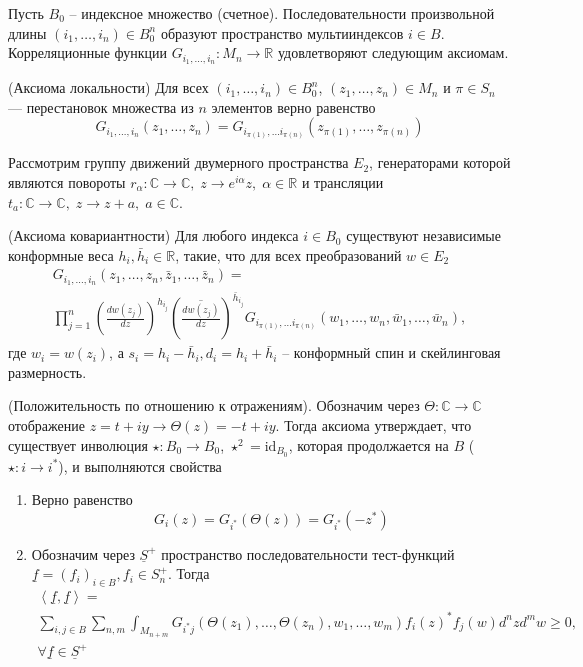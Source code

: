   Пусть $B_{0}$ -- индексное множество (счетное). Последовательности произвольной длины $(i_{1},\dots,i_{n})\in B_{0}^{n}$ образуют пространство мультииндексов $i\in B$.  Корреляционные функции $G_{i_{1},\dots, i_{n}}:M_{n}\to \mathbb{R}$ удовлетворяют следующим аксиомам.
\begin{axiom}
  (Аксиома локальности)
  Для всех $(i_{1},\dots,i_{n})\in B_{0}^{n}$, $(z_{1},\dots, z_{n})\in M_{n}$ и $\pi\in S_{n}$ --- перестановок множества из $n$ элементов верно равенство
  \begin{equation}
    \label{eq:51}
    G_{i_{1},\dots,i_{n}}(z_{1},\dots,z_{n})=G_{i_{\pi(1)},\dots i_{\pi(n)}}(z_{\pi(1)},\dots, z_{\pi(n)})
  \end{equation}
\end{axiom}
Рассмотрим группу движений двумерного пространства $E_{2}$, генераторами которой являются повороты $r_{\alpha}:\mathbb{C}\to\mathbb{C}, \; z\to e^{i\alpha}z,\; \alpha\in \mathbb{R}$ и трансляции $t_{a}:\mathbb{C}\to\mathbb{C},\; z\to z+a,\; a\in\mathbb{C}$. 
\begin{axiom}
  (Аксиома ковариантности)
  Для любого индекса $i\in B_{0}$  существуют независимые конформные веса $h_{i},\bar h_{i}\in \mathbb{R}$, такие, что для всех преобразований $w\in E_{2}$
  \begin{multline}
    \label{eq:52}
    G_{i_{1},\dots,i_{n}}(z_{1},\dots,z_{n},\bar z_{1},\dots, \bar z_{n})=\\
\prod_{j=1}^{n}\left(\frac{dw(z_{j})}{dz}\right)^{h_{i_{j}}}\left(\overline{\frac{dw(z_{j})}{dz}}\right)^{\bar{h}_{i_{j}}} G_{i_{\pi(1)},\dots i_{\pi(n)}}(w_{1},\dots, w_{n},\bar w_{1},\dots,\bar w_{n}),
  \end{multline}
где $w_{i}=w(z_{i})$, а $s_{i}=h_{i}-\bar h_{i}, d_{i}=h_{i}+\bar h_{i}$  -- конформный спин и скейлинговая размерность.
\end{axiom}
\begin{axiom}
  (Положительность по отношению к отражениям).
  Обозначим через $\Theta:\mathbb{C}\to\mathbb{C}$  отображение $z=t+i y\to \Theta(z)= -t+i y$. Тогда аксиома утверждает, что существует инволюция $\star:B_{0}\to B_{0}$, $\star^{2}=\mathrm{id}_{B_{0}}$, которая продолжается на $B$ ($\star:i\to i^{*}$), и выполняются свойства
  \begin{enumerate}
  \item Верно равенство
    \begin{equation}
      \label{eq:53}
      G_{i}(z)=G_{i^{*}}(\Theta(z))=G_{i^{*}}(-z^{*})
    \end{equation}
  \item Обозначим через $\underline{S}^{+}$ пространство последовательности тест-функций $\underline{f}=(f_{i})_{i\in B}, f_{i}\in S^{+}_{n}$. Тогда
    \begin{multline}
      \label{eq:54}
      \left<\underline{f},\underline{f}\right>=\\
      \sum_{i,j\in B}\sum_{n,m}\int_{M_{n+m}}G_{i^{*} j}(\Theta(z_{1}),\dots ,\Theta(z_{n}),w_{1},\dots,w_{m}) f_{i}(z)^{*}f_{j}(w) d^{n}z d^{m}w 
      \geq 0,\\ \forall \underline{f}\in \underline{S}^{+}
    \end{multline}
  \end{enumerate}
\end{axiom}
